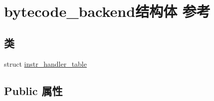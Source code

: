 \hypertarget{structbytecode__backend}{}\section{bytecode\+\_\+backend结构体 参考}
\label{structbytecode__backend}
\subsection*{类}
\begin{DoxyCompactItemize}
\item 
struct \hyperlink{structbytecode__backend_1_1instr__handler__table}{instr\+\_\+handler\+\_\+table}
\end{DoxyCompactItemize}
\subsection*{Public 属性}
